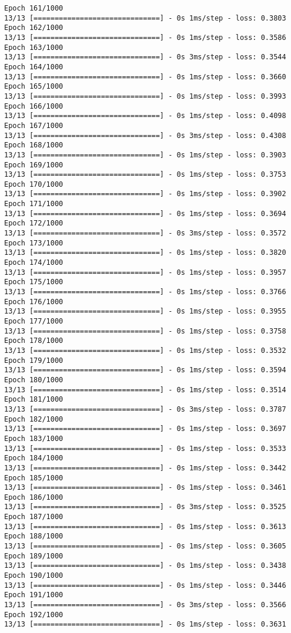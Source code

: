 \documentclass[11pt]{article}
\begin{document}
\begin{Verbatim}[commandchars=\\\{\}]
Epoch 161/1000
13/13 [==============================] - 0s 1ms/step - loss: 0.3803
Epoch 162/1000
13/13 [==============================] - 0s 1ms/step - loss: 0.3586
Epoch 163/1000
13/13 [==============================] - 0s 3ms/step - loss: 0.3544
Epoch 164/1000
13/13 [==============================] - 0s 1ms/step - loss: 0.3660
Epoch 165/1000
13/13 [==============================] - 0s 1ms/step - loss: 0.3993
Epoch 166/1000
13/13 [==============================] - 0s 1ms/step - loss: 0.4098
Epoch 167/1000
13/13 [==============================] - 0s 3ms/step - loss: 0.4308
Epoch 168/1000
13/13 [==============================] - 0s 1ms/step - loss: 0.3903
Epoch 169/1000
13/13 [==============================] - 0s 1ms/step - loss: 0.3753
Epoch 170/1000
13/13 [==============================] - 0s 1ms/step - loss: 0.3902
Epoch 171/1000
13/13 [==============================] - 0s 1ms/step - loss: 0.3694
Epoch 172/1000
13/13 [==============================] - 0s 3ms/step - loss: 0.3572
Epoch 173/1000
13/13 [==============================] - 0s 1ms/step - loss: 0.3820
Epoch 174/1000
13/13 [==============================] - 0s 1ms/step - loss: 0.3957
Epoch 175/1000
13/13 [==============================] - 0s 1ms/step - loss: 0.3766
Epoch 176/1000
13/13 [==============================] - 0s 1ms/step - loss: 0.3955
Epoch 177/1000
13/13 [==============================] - 0s 1ms/step - loss: 0.3758
Epoch 178/1000
13/13 [==============================] - 0s 1ms/step - loss: 0.3532
Epoch 179/1000
13/13 [==============================] - 0s 1ms/step - loss: 0.3594
Epoch 180/1000
13/13 [==============================] - 0s 1ms/step - loss: 0.3514
Epoch 181/1000
13/13 [==============================] - 0s 3ms/step - loss: 0.3787
Epoch 182/1000
13/13 [==============================] - 0s 1ms/step - loss: 0.3697
Epoch 183/1000
13/13 [==============================] - 0s 1ms/step - loss: 0.3533
Epoch 184/1000
13/13 [==============================] - 0s 1ms/step - loss: 0.3442
Epoch 185/1000
13/13 [==============================] - 0s 1ms/step - loss: 0.3461
Epoch 186/1000
13/13 [==============================] - 0s 3ms/step - loss: 0.3525
Epoch 187/1000
13/13 [==============================] - 0s 1ms/step - loss: 0.3613
Epoch 188/1000
13/13 [==============================] - 0s 1ms/step - loss: 0.3605
Epoch 189/1000
13/13 [==============================] - 0s 1ms/step - loss: 0.3438
Epoch 190/1000
13/13 [==============================] - 0s 1ms/step - loss: 0.3446
Epoch 191/1000
13/13 [==============================] - 0s 3ms/step - loss: 0.3566
Epoch 192/1000
13/13 [==============================] - 0s 1ms/step - loss: 0.3631

\end{Verbatim}
\end{document}
